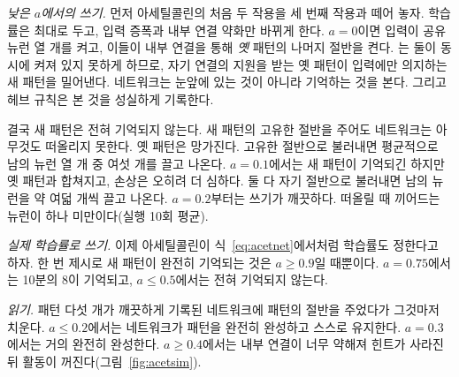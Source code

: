 \emph{낮은 $a$에서의 쓰기.} 먼저 아세틸콜린의 처음 두 작용을 세 번째 작용과 떼어 놓자. 학습률은 최대로 두고, 입력 증폭과 내부 연결 약화만 바뀌게 한다. $a=0$이면 입력이 공유 뉴런 열 개를 켜고, 이들이 내부 연결을 통해 \emph{옛} 패턴의 나머지 절반을 켠다. 는 둘이 동시에 켜져 있지 못하게 하므로, 자기 연결의 지원을 받는 옛 패턴이 입력에만 의지하는 새 패턴을 밀어낸다. 네트워크는 눈앞에 있는 것이 아니라 기억하는 것을 본다. 그리고 헤브 규칙은 본 것을 성실하게 기록한다.

결국 새 패턴은 전혀 기억되지 않는다. 새 패턴의 고유한 절반을 주어도 네트워크는 아무것도 떠올리지 못한다. 옛 패턴은 망가진다. 고유한 절반으로 불러내면 평균적으로 남의 뉴런 열 개 중 여섯 개를 끌고 나온다. $a=0.1$에서는 새 패턴이 기억되긴 하지만 옛 패턴과 합쳐지고, 손상은 오히려 더 심하다. 둘 다 자기 절반으로 불러내면 남의 뉴런을 약 여덟 개씩 끌고 나온다. $a=0.2$부터는 쓰기가 깨끗하다. 떠올릴 때 끼어드는 뉴런이 하나 미만이다(실행 10회 평균).

\emph{실제 학습률로 쓰기.} 이제 아세틸콜린이 식~\eqref{eq:acetnet}에서처럼 학습률도 정한다고 하자. 한 번 제시로 새 패턴이 완전히 기억되는 것은 $a\ge0.9$일 때뿐이다. $a=0.75$에서는 10분의 8이 기억되고, $a\le0.5$에서는 전혀 기억되지 않는다.

\emph{읽기.} 패턴 다섯 개가 깨끗하게 기록된 네트워크에 패턴의 절반을 주었다가 그것마저 치운다. $a\le0.2$에서는 네트워크가 패턴을 완전히 완성하고 스스로 유지한다. $a=0.3$에서는 거의 완전히 완성한다. $a\ge0.4$에서는 내부 연결이 너무 약해져 힌트가 사라진 뒤 활동이 꺼진다(그림~\ref{fig:acetsim}).

